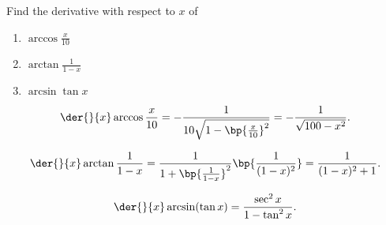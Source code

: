 \clearpage
\begin{problem}
    Find the derivative with respect to $x$ of

    \begin{enumerate}
        \item $\arccos{\frac{x}{10}}$
        \item $\arctan{\frac1{1-x}}$
        \item $\arcsin{\tan x}$
    \end{enumerate}
\end{problem}
\begin{solution}
    \begin{ppart}
        \[\der{}{x} \arccos \frac{x}{10} = -\frac1{10\sqrt{1-\bp{\frac{x}{10}}^2}} = -\frac{1}{\sqrt{100 - x^2}}.\]
    \end{ppart}
    \begin{ppart}
        \[\der{}{x} \arctan{\frac1{1-x}} = \frac{1}{1 + \bp{\frac1{1-x}}^2} \bp{\frac1{(1-x)^2}} = \frac1{(1-x)^2+1}.\]
    \end{ppart}
    \begin{ppart}
        \[\der{}{x} \arcsin (\tan x) = \frac{\sec^2x}{1-\tan^2 x}.\]
    \end{ppart}
\end{solution}

